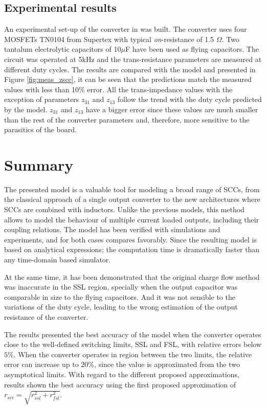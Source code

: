 \subsection{Experimental results}
An experimental set-up of the converter in was built. The converter uses four MOSFETs TN0104 from Supertex with typical \emph{on}-resistance of 1.5 $\Omega$. Two tantalum electrolytic capacitors of 10$\mu$F have been used as flying capacitors. The circuit was operated at 5kHz and the trans-resistance parameters are measured at different duty cycles. The results are compared with the model and  presented in Figure \ref{fig:meas_zscc}, it can be seen that the predictions match the measured values with less than 10\% error. All the trans-impedance values with the exception of  parameters $z_{31}$ and $z_{13}$ follow the trend with the duty cycle predicted by the model. $z_{31}$ and $z_{13}$ have a bigger error since these values are much smaller than the rest of the converter parameters and, therefore, more sensitive to the parasitics of the board.





\section{Summary}
The presented model is a valuable tool for  modeling a broad range of SCCs, from the classical approach of a single output converter to the new architectures where SCCs are combined with inductors. Unlike the previous models, this method allows to model the behaviour of multiple current loaded outputs, including their coupling relations. The model has been verified with simulations and experiments, and for both cases compares favorably. Since the resulting model is based on analytical expressions; the computation time is dramatically faster than any time-domain based simulator.

At the same time, it has been demonstrated that the original charge flow method was inaccurate in the SSL region, specially when the output capacitor was comparable in size to the flying capacitors. And it was not sensible to the variations of the duty cycle, leading to the wrong estimation of the output resistance of the converter.

The results presented the best accuracy of the model when the converter operates close to the well-defined switching limits, SSL and FSL, with relative errors below $5\%$. When the converter operates in region between the two limits, the relative error can increase up to $20\%$, since the value is approximated from the two asymptotical limits. With regard to the different proposed approximations, results shown the best accuracy using the first proposed approximation of $r_{scc} = \sqrt{r_{ssl}^2 + r_{fsl}^2}$.

\clearpage

 